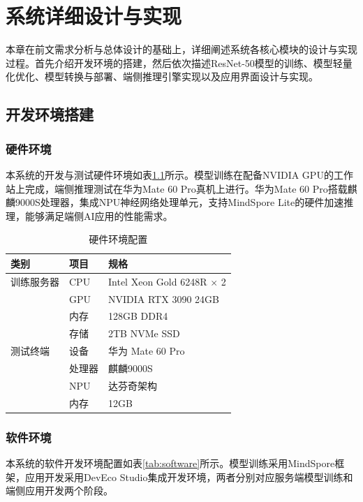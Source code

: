 \chapter{系统详细设计与实现}

本章在前文需求分析与总体设计的基础上，详细阐述系统各核心模块的设计与实现过程。首先介绍开发环境的搭建，然后依次描述ResNet-50模型的训练、模型轻量化优化、模型转换与部署、端侧推理引擎实现以及应用界面设计与实现。

\section{开发环境搭建}

\subsection{硬件环境}

本系统的开发与测试硬件环境如表\ref{tab:hardware}所示。模型训练在配备NVIDIA GPU的工作站上完成，端侧推理测试在华为Mate 60 Pro真机上进行。华为Mate 60 Pro搭载麒麟9000S处理器，集成NPU神经网络处理单元，支持MindSpore Lite的硬件加速推理，能够满足端侧AI应用的性能需求。

\begin{table}[htbp]
	\centering
	\caption{硬件环境配置}
	\label{tab:hardware}
	\begin{tabular}{lll}
		\toprule
		类别 & 项目 & 规格 \\
		\midrule
		训练服务器 & CPU & Intel Xeon Gold 6248R $\times$ 2 \\
		 & GPU & NVIDIA RTX 3090 24GB \\
		 & 内存 & 128GB DDR4 \\
		 & 存储 & 2TB NVMe SSD \\
		\midrule
		测试终端 & 设备 & 华为 Mate 60 Pro \\
		 & 处理器 & 麒麟9000S \\
		 & NPU & 达芬奇架构 \\
		 & 内存 & 12GB \\
		\bottomrule
	\end{tabular}
\end{table}

\subsection{软件环境}

本系统的软件开发环境配置如表\ref{tab:software}所示。模型训练采用MindSpore框架，应用开发采用DevEco Studio集成开发环境，两者分别对应服务端模型训练和端侧应用开发两个阶段。

